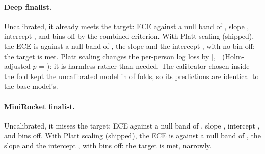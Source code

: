 \paragraph{Deep finalist.}
Uncalibrated, it already meets the target: ECE  against a null band of , slope , intercept , and  bins off by the combined criterion.
With Platt scaling (shipped), the ECE is  against a null band of , the slope  and the intercept , with no bin off: the target is met.
Platt scaling changes the per-person log loss by  [, ] (Holm-adjusted $p$ = ): it is harmless rather than needed.
The calibrator chosen inside the fold kept the uncalibrated model in  of  folds, so its predictions are identical to the base model's.

\paragraph{MiniRocket finalist.}
Uncalibrated, it misses the target: ECE  against a null band of , slope , intercept , and  bins off.
With Platt scaling (shipped), the ECE is  against a null band of , the slope  and the intercept , with  bins off: the target is met, narrowly.

